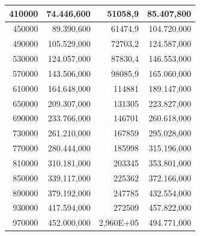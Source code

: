 \documentclass[a4paper, 12pt]{article}
\begin{document}
\begin{longtable}[c]{rrrr}
	\multicolumn{1}{|r|}{410000}                  & \multicolumn{1}{r|}{74.446,600}        & \multicolumn{1}{r|}{51058,9}           & \multicolumn{1}{r|}{85.407,800}     \\ \hline
	\multicolumn{1}{|r|}{450000}                  & \multicolumn{1}{r|}{89.390,600}        & \multicolumn{1}{r|}{61474,9}           & \multicolumn{1}{r|}{104.720,000}    \\ \hline
	\multicolumn{1}{|r|}{490000}                  & \multicolumn{1}{r|}{105.529,000}       & \multicolumn{1}{r|}{72703,2}           & \multicolumn{1}{r|}{124.587,000}    \\ \hline
	\multicolumn{1}{|r|}{530000}                  & \multicolumn{1}{r|}{124.057,000}       & \multicolumn{1}{r|}{87830,4}           & \multicolumn{1}{r|}{146.553,000}    \\ \hline
	\multicolumn{1}{|r|}{570000}                  & \multicolumn{1}{r|}{143.506,000}       & \multicolumn{1}{r|}{98085,9}           & \multicolumn{1}{r|}{165.060,000}    \\ \hline
	\multicolumn{1}{|r|}{610000}                  & \multicolumn{1}{r|}{164.648,000}       & \multicolumn{1}{r|}{114881}            & \multicolumn{1}{r|}{189.147,000}    \\ \hline
	\multicolumn{1}{|r|}{650000}                  & \multicolumn{1}{r|}{209.307,000}       & \multicolumn{1}{r|}{131305}            & \multicolumn{1}{r|}{223.827,000}    \\ \hline
	\multicolumn{1}{|r|}{690000}                  & \multicolumn{1}{r|}{233.766,000}       & \multicolumn{1}{r|}{146701}            & \multicolumn{1}{r|}{260.618,000}    \\ \hline
	\multicolumn{1}{|r|}{730000}                  & \multicolumn{1}{r|}{261.210,000}       & \multicolumn{1}{r|}{167859}            & \multicolumn{1}{r|}{295.028,000}    \\ \hline
	\multicolumn{1}{|r|}{770000}                  & \multicolumn{1}{r|}{280.444,000}       & \multicolumn{1}{r|}{185998}            & \multicolumn{1}{r|}{315.196,000}    \\ \hline
	\multicolumn{1}{|r|}{810000}                  & \multicolumn{1}{r|}{310.181,000}       & \multicolumn{1}{r|}{203345}            & \multicolumn{1}{r|}{353.801,000}    \\ \hline
	\multicolumn{1}{|r|}{850000}                  & \multicolumn{1}{r|}{339.117,000}       & \multicolumn{1}{r|}{225362}            & \multicolumn{1}{r|}{372.166,000}    \\ \hline
	\multicolumn{1}{|r|}{890000}                  & \multicolumn{1}{r|}{379.192,000}       & \multicolumn{1}{r|}{247785}            & \multicolumn{1}{r|}{432.554,000}    \\ \hline
	\multicolumn{1}{|r|}{930000}                  & \multicolumn{1}{r|}{417.594,000}       & \multicolumn{1}{r|}{272509}            & \multicolumn{1}{r|}{457.822,000}    \\ \hline
	\multicolumn{1}{|r|}{970000}                  & \multicolumn{1}{r|}{452.000,000}       & \multicolumn{1}{r|}{2,960E+05}         & \multicolumn{1}{r|}{494.771,000}    \\ \hline
\end{longtable}
\end{document}
